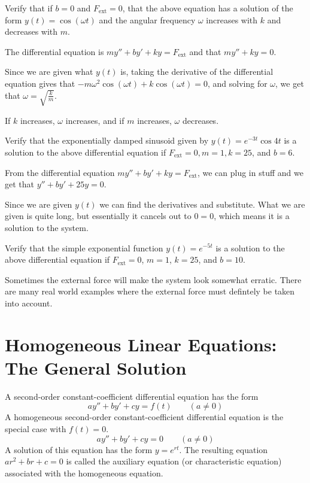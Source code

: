 \documentclass[../diffeq.tex]{subfiles}
\begin{document}
\begin{example}
    Verify that if $b=0$ and $F_{\text{ext}}=0$, that the above equation has a solution of the form $y(t)=\cos(\omega t)$ and the angular frequency $\omega$ increases with $k$ and decreases with $m$.

    The differential equation is $my''+by'+ky=F_{\text{ext}}$ and that $my''+ky=0$.

    Since we are given what $y(t)$ is, taking the derivative of the differential equation gives that $-m\omega^2\cos(\omega t)+k\cos(\omega t)=0$, and solving for $\omega$, we get that $\omega=\sqrt{\frac{k}{m}}$.

    If $k$ increases, $\omega$ increases, and if $m$ increases, $\omega$ decreases.
\end{example}

\begin{example}
    Verify that the exponentially damped sinusoid given by $y(t)=e^{-3t}\cos 4t$ is a solution to the above differential equation if $F_{\text{ext}}=0, m=1, k=25$, and $b=6$.

    From the differential equation $my''+by'+ky=F_{\text{ext}}$, we can plug in stuff and we get that $y''+by'+25y=0$.

    Since we are given $y(t)$ we can find the derivatives and substitute. What we are given is quite long, but essentially it cancels out to $0=0$, which means it is a solution to the system.
\end{example}

\ex Verify that the simple exponential function $y(t)=e^{-5t}$ is a solution to the above differential equation if $F_{\text{ext}}=0$, $m=1$, $k=25$, and $b=10$.

Sometimes the external force will make the system look somewhat erratic. There are many real world examples where the external force must defintely be taken into account.

\section{Homogeneous Linear Equations: The General Solution}
A second-order constant-coefficient differential equation has the form 
\[ ay''+by'+cy=f(t) \qquad (a\neq 0) \]
A homogeneous second-order constant-coefficient differential equation is the special case with $f(t)=0$.
\[ ay''+by'+cy=0 \qquad (a\neq 0) \]
A solution of this equation has the form $y=e^{rt}$. The resulting equation $ar^2+br+c=0$ is called the auxiliary equation (or characteristic equation) associated with the homogeneous equation.
\end{document}
